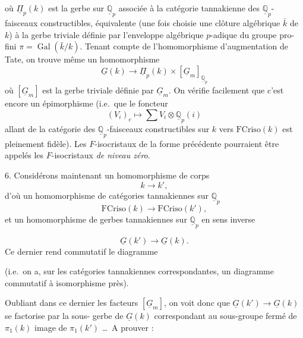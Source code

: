\documentclass[11pt,a4paper]{article}
\begin{document}
où $\underline{\Pi}_{p}(k)$ est la gerbe sur $\underline{\mathbb{Q}}_{p}$
\struck{\ill{}} associée à la catégorie tannakienne des
$\underline{\mathbb{Q}}_{p}$-faisceaux constructibles, équivalente
\struck{\ill{}} (une fois choisie une clôture algébrique $\bar{k}$ de $k$) à
la gerbe triviale définie par l'enveloppe algébrique  $p$-adique
du groupe pro-fini $\pi = \operatorname{Gal}(\bar{k}/k)$. Tenant compte de
l'homomorphisme d'augmentation de Tate, on trouve même un homomorphisme
\[
\underline{G}(k) \longrightarrow \underline{\Pi}_{p}(k) \times
[\underline{G}_{m}]_{\underline{\mathbb{Q}}_{p}}
\]
où $[\underline{G}_{m}]$ est la gerbe triviale définie par
$\underline{G}_{m}$. On vérifie facilement que c'est encore un épimorphisme
(i.e.\ que le foncteur
\[
(V_{i})_{c} \longmapsto \sum V_{i} \otimes \underline{\mathbb{Q}}_{p}(i)
\]
allant de la catégorie des \struck{\ill{}}
$\underline{\mathbb{Q}}_{p}$-faisceaux constructibles  sur $k$
vers $\mathrm{FCriso}(k)$ est pleinement fidèle). Les $F$-isocristaux de la
forme précédente pourraient être appelés les $F$-isocristaux
\emph{de niveau zéro}.

6. \quad Considérons maintenant un homomorphisme de corps \struck{\ill{}}
\[
k \longrightarrow k' ,
\]
d'où un homomorphisme de catégories tannakiennes sur
$\underline{\mathbb{Q}}_{p}$
\[
\mathrm{FCriso}(k) \longrightarrow \mathrm{FCriso}(k') ,
\]
et un homomorphisme de gerbes tannakiennes sur
$\underline{\mathbb{Q}}_{p}$ en sens inverse

\[
\underline{G}(k') \longrightarrow \underline{G}(k) .
\]
 Ce dernier rend commutatif le diagramme


(i.e.\ on a, sur les catégories tannakiennes \struck{\ill{}} correspondantes,
un diagramme commutatif à isomorphisme  près).

Oubliant dans ce dernier les facteurs $[\underline{G}_{m}]$, on voit donc que
$\underline{G}(k') \to \underline{G}(k)$ se factorise par la
sous- gerbe de $\underline{G}(k)$ correspondant au
sous-groupe fermé de $\pi_{1}(k)$ image de $\pi_{1}(k')$ …\ A prouver :
\end{document}
